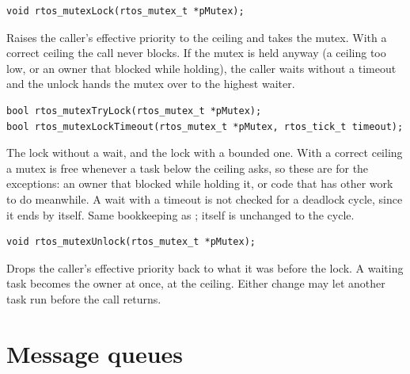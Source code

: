 \begin{lstlisting}
void rtos_mutexLock(rtos_mutex_t *pMutex);
\end{lstlisting}
Raises the caller's effective priority to the ceiling and takes the mutex. With a correct
ceiling the call never blocks. If the mutex is held anyway (a ceiling too low, or an
owner that blocked while holding), the caller waits without a timeout and the unlock
hands the mutex over to the highest waiter.

\begin{lstlisting}
bool rtos_mutexTryLock(rtos_mutex_t *pMutex);
bool rtos_mutexLockTimeout(rtos_mutex_t *pMutex, rtos_tick_t timeout);
\end{lstlisting}
The lock without a wait, and the lock with a bounded one. With a correct ceiling a mutex
is free whenever a task below the ceiling asks, so these are for the exceptions: an owner
that blocked while holding it, or code that has other work to do meanwhile. A wait with a
timeout is not checked for a deadlock cycle, since it ends by itself. Same bookkeeping as
;  itself is unchanged to the cycle.

\begin{lstlisting}
void rtos_mutexUnlock(rtos_mutex_t *pMutex);
\end{lstlisting}
Drops the caller's effective priority back to what it was before the lock. A waiting
task becomes the owner at once, at the ceiling. Either change may let another task run
before the call returns.

\section{Message queues}

